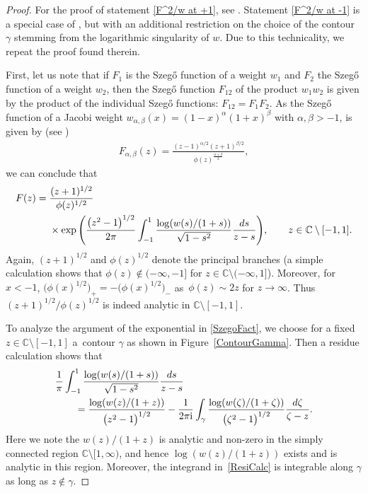 \documentclass[10pt,a4paper]{amsart}
\newcommand{\C}{\mathbb{C}}
\newcommand{\I}{\mathrm{i}}
\numberwithin{equation}{section}
\begin{document}
\begin{proof}
For the proof of statement \eqref{F^2/w at +1}, see \cite[Proposition~A.1]{CD}. Statement \eqref{F^2/w at -1} is a special case of \cite[Lemma~6.6]{KMVV}, but with an additional restriction on the choice of the contour $\gamma$ stemming from the logarithmic singularity of $w$. Due to this technicality, we repeat the proof found therein.

First, let us note that if $F_1$ is the Szeg\H{o} function of a weight $w_1$ and $F_2$ the Szeg\H{o} function of a weight $w_2$, then the Szeg\H{o} function $F_{12}$ of the product $w_1w_2$ is given by the product of the individual Szeg\H{o} functions: $F_{12} = F_1 F_2$. As the Szeg\H{o} function of a Jacobi weight $w_{\alpha,\beta}(x) = (1-x)^\alpha (1+x)^\beta$ with $\alpha, \beta > -1$, is given by (see \cite[Remark 5.1]{KMVV})
\begin{align*}
 F_{\alpha,\beta}(z) = \frac{(z-1)^{\alpha/2}(z+1)^{\beta/2}}{\phi(z)^{\frac{\alpha+\beta}{2}}},
\end{align*}
we can conclude that
\begin{align}
 F(z) ={}& \frac{(z+1)^{1/2}}{\phi(z)^{1/2}}\nonumber\\
 &\times\exp \Bigg( \dfrac{\big(z^2-1\big)^{1/2}}{2 \pi}\int_{-1}^1 \dfrac{\log (w(s)/(1+s))}{\sqrt{1-s^2}} \dfrac{{\rm d}s}{z-s} \Bigg),
 \qquad z \in \C \setminus [-1,1].\label{SzegoFact}
\end{align}
Again, $(z+1)^{1/2}$ and $\phi(z)^{1/2}$ denote the principal branches (a simple calculation shows that $\phi(z) \not \in (-\infty, -1]$ for $z \in \C \setminus (-\infty, 1]$). Moreover, for $x < -1$, $\big(\phi(x)^{1/2}\big)_+ = -\big(\phi(x)^{1/2}\big)_-$ as~$\phi(z) \sim 2z$ for $z \to \infty$. Thus $(z+1)^{1/2}/\phi(z)^{1/2}$ is indeed analytic in $\C\setminus [-1,1]$.

To analyze the argument of the exponential in \eqref{SzegoFact}, we choose for a fixed $z \in \C \setminus [-1,1]$ a~contour $\gamma$ as shown in Figure~\ref{ContourGamma}. Then a residue calculation shows that
\begin{align}\nonumber
 &\frac{1}{\pi} \int_{-1}^1 \frac{\log(w(s)/(1+s))}{\sqrt{1-s^2}} \frac{{\rm d}s}{z-s}
 \\\label{ResiCalc}
 &\qquad= \frac{\log(w(z)/(1+z))}{\big(z^2-1\big)^{1/2}} - \frac{1}{2\pi\I} \int_\gamma\frac{\log(w(\zeta)/(1+\zeta))}{\big(\zeta^2-1\big)^{1/2}} \frac{{\rm d}\zeta}{\zeta-z}.
\end{align}
Here we note the $w(z)/(1+z)$ is analytic and non-zero in the simply connected region $\C \setminus [1,\infty)$, and hence $\log(w(z)/(1+z))$ exists and is analytic in this region. Moreover, the integrand in~\eqref{ResiCalc} is integrable along $\gamma$ as long as $z \not \in \gamma$.


\end{proof}
\end{document}
